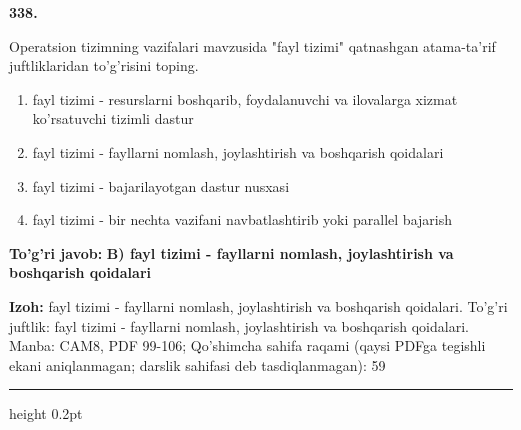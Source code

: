 \documentclass[10pt,a4paper]{article}
\begin{document}
{\bfseries\sffamily\color{ink} 338.}
\par
Operatsion tizimning vazifalari mavzusida "fayl tizimi" qatnashgan atama-ta'rif juftliklaridan to'g'risini toping.
\begin{enumerate}[label=\Alph*),leftmargin=9mm]
\item fayl tizimi - resurslarni boshqarib, foydalanuvchi va ilovalarga xizmat ko'rsatuvchi tizimli dastur
\item fayl tizimi - fayllarni nomlash, joylashtirish va boshqarish qoidalari
\item fayl tizimi - bajarilayotgan dastur nusxasi
\item fayl tizimi - bir nechta vazifani navbatlashtirib yoki parallel bajarish
\end{enumerate}
\begin{tcolorbox}[enhanced,breakable,colback=teal!4,colframe=teal!60!black,boxrule=0.45pt,arc=1.2mm,left=2.7mm,right=2.7mm,top=1.8mm,bottom=1.8mm,before skip=2mm,after skip=2mm]
{\bfseries\sffamily\color{teal}To'g'ri javob:} \textbf{B) fayl tizimi - fayllarni nomlash, joylashtirish va boshqarish qoidalari}
\par\smallskip
{\bfseries Izoh:} fayl tizimi - fayllarni nomlash, joylashtirish va boshqarish qoidalari. To'g'ri juftlik: fayl tizimi - fayllarni nomlash, joylashtirish va boshqarish qoidalari. Manba: CAM8, PDF 99-106; Qo'shimcha sahifa raqami (qaysi PDFga tegishli ekani aniqlanmagan; darslik sahifasi deb tasdiqlanmagan): 59
\end{tcolorbox}
\vspace{2mm}\hrule height 0.2pt\vspace{3mm}
\end{document}
